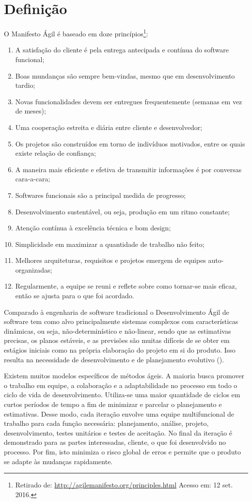 \section{Definição}
\par O Manifesto Ágil é baseado em doze princípios\footnote{Retirado de: \url{http://agilemanifesto.org/principles.html} Acesso em: 12 set. 2016.}:
\begin{enumerate}
  \item A satisfação do cliente é pela entrega antecipada e contínua do software funcional;
  \item Boas mundanças são sempre bem-vindas, mesmo que em desenvolvimento tardio;
  \item Novas funcionalidades devem ser entregues frequentemente (semanas em vez de meses);
  \item Uma cooperação estreita e diária entre cliente e desenvolvedor;
  \item Os projetos são construídos em torno de indivíduos motivados, entre os quais existe relação de confiança;
  \item A maneira mais eficiente e efetiva de transmitir informações é por conversas cara-a-cara;
  \item Softwares funcionais são a principal medida de progresso;
  \item Desenvolvimento sustentável, ou seja, produção em um ritmo constante;
  \item Atenção contínua à excelência técnica e bom design;
  \item Simplicidade em maximizar a quantidade de trabalho não feito;
  \item Melhores arquiteturas, requisitos e projetos emergem de equipes auto-organizadas;
  \item Regularmente, a equipe se reuni e reflete sobre como tornar-se mais eficaz, então se ajusta para o que foi acordado.
\end{enumerate}
\par Comparado à engenharia de software tradicional o Desenvolvimento Ágil de software tem como alvo principalmente sistemas complexos com características dinâmicas, ou seja, não-determinístico e não-linear, sendo que as estimativas precisas, os planos estáveis, e as previsões são muitas difíceis de se obter em estágios iniciais como na própria elaboração do projeto em si do produto. Isso resulta na necessidade de desenvolvimento e de planejamento evolutivo (\cite{Craig:04}).
\par Existem muitos modelos específicos de métodos ágeis. A maioria busca promover o trabalho em equipe, a colaboração e a adaptabilidade no processo em todo o ciclo de vida de desenvolvimento. Utiliza-se uma maior quantidade de ciclos em curtos períodos de tempo a fim de minimizar e parcelar o planejamento e estimativas. Desse modo, cada iteração envolve uma equipe multifuncional de trabalho para cada função necessária: planejamento, análise, projeto, desenvolvimento, testes unitários e testes de aceitação. No final da iteração é demonstrado para as partes interessadas, cliente, o que foi desenvolvido no processo. Por fim, isto minimiza o risco global de erros e permite que o produto se adapte às mudanças rapidamente.
